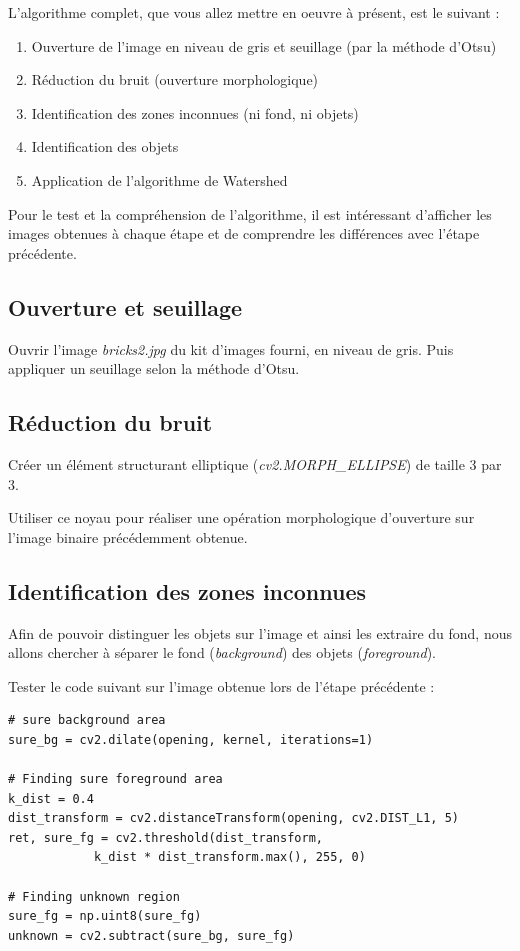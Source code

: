 \documentclass[a4paper,11pt,titlepage]{article} %
\begin{document}
L'algorithme complet, que vous allez mettre en oeuvre à présent, est le suivant :

\begin{enumerate}
	\item Ouverture de l'image en niveau de gris et seuillage (par la méthode d'Otsu)
	\item Réduction du bruit (ouverture morphologique)
	\item Identification des zones inconnues (ni fond, ni objets)
	\item Identification des objets	
	\item Application de l'algorithme de Watershed
\end{enumerate}

Pour le test et la compréhension de l'algorithme, il est intéressant d'afficher les images obtenues à chaque étape et de comprendre les différences avec l'étape précédente.
	
\subsection{Ouverture et seuillage}

\Manip Ouvrir l'image \textsl{bricks2.jpg} du kit d'images fourni, en niveau de gris. Puis appliquer un seuillage selon la méthode d'Otsu.

\subsection{Réduction du bruit}

\Manip Créer un élément structurant elliptique (\textsl{cv2.MORPH\_ELLIPSE}) de taille 3 par 3.

\Manip Utiliser ce noyau pour réaliser une opération morphologique d'ouverture sur l'image binaire précédemment obtenue. 

\subsection{Identification des zones inconnues}

Afin de pouvoir distinguer les objets sur l'image et ainsi les extraire du fond, nous allons chercher à séparer le fond (\textit{background}) des objets (\textit{foreground}).

\Manip Tester le code suivant sur l'image obtenue lors de l'étape précédente :

\begin{lstlisting}
# sure background area
sure_bg = cv2.dilate(opening, kernel, iterations=1)

# Finding sure foreground area
k_dist = 0.4
dist_transform = cv2.distanceTransform(opening, cv2.DIST_L1, 5)
ret, sure_fg = cv2.threshold(dist_transform, 
			k_dist * dist_transform.max(), 255, 0)

# Finding unknown region
sure_fg = np.uint8(sure_fg)
unknown = cv2.subtract(sure_bg, sure_fg)
\end{lstlisting}
\end{document}
